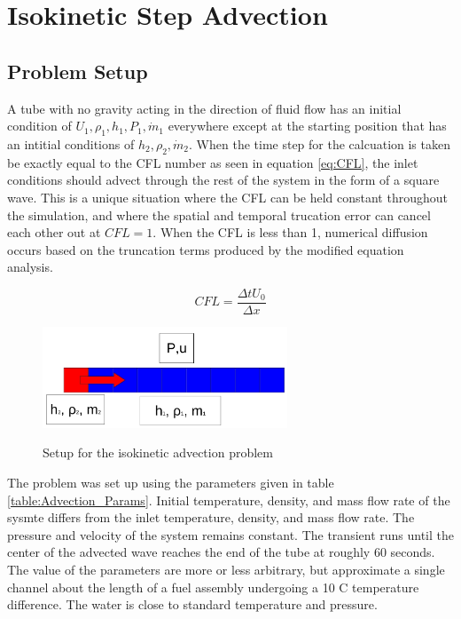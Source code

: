 \vspace*{-80mm}
\chapter{Isokinetic Step Advection} \label{chapter4:Isokinetic_Step_Advection}
 
	\section{Problem Setup} \label{Verification:Advection}
    
    A tube with no gravity acting in the direction of fluid flow has an initial
    condition of $U_{1},\rho_{1},h_{1},P_{1},\dot{m}_{1}$ everywhere except at the 
    starting position that has an intitial conditions of $h_{2},\rho_{2},\dot{m}_{2}$. 
    When the time step for the calcuation is taken be exactly equal to the CFL
    number as seen in equation \ref{eq:CFL}, the inlet conditions should advect
    through the rest of the system in the form of a square wave. This is a
    unique situation where the CFL can be held constant throughout the
    simulation, and where the spatial and temporal trucation error can cancel
    each other out at $CFL=1$. When the CFL is less than 1, numerical
    diffusion occurs based on the truncation terms produced by the modified
    equation analysis.
    
    \begin{equation}
    	\label{eq:CFL}
    	CFL = \frac{\Delta t  U_{0} }{\Delta x}
    \end{equation}
    
    \begin{figure}[!h]
    	\centering
    	\includegraphics[width=0.65\textwidth]{images/Verification_Problem1_advection}
    	\label{fig:Verification_1}
    	\caption{Setup for the isokinetic advection problem}
    \end{figure}
    
    The problem was set up using the parameters given in table
    \ref{table:Advection_Params}. Initial temperature, density, and mass flow
    rate of the sysmte differs from the inlet temperature, density, and mass
    flow rate. The pressure and velocity of the system remains constant. The
    transient runs until the center of the advected wave reaches the end of the
    tube at roughly 60 seconds. The value of the parameters are more or less
    arbitrary, but approximate a single channel about the length of a fuel
    assembly undergoing a 10 C temperature difference. The water is close to
    standard temperature and pressure. 
    
